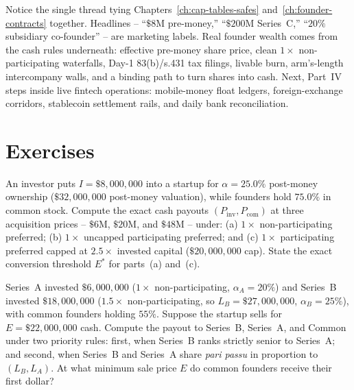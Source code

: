 \begin{walkbox}
Notice the single thread tying Chapters~\ref{ch:cap-tables-safes} and~\ref{ch:founder-contracts} together. Headlines -- ``$\$8\text{M}$ pre-money,'' ``$\$200\text{M}$ Series~C,'' ``$20\%$ subsidiary co-founder'' -- are marketing labels. Real founder wealth comes from the cash rules underneath: effective pre-money share price, clean $1\times$ non-participating waterfalls, Day-1 83(b)/s.431 tax filings, livable burn, arm's-length intercompany walls, and a binding path to turn shares into cash. Next, Part~IV steps inside live fintech operations: mobile-money float ledgers, foreign-exchange corridors, stablecoin settlement rails, and daily bank reconciliation.
\end{walkbox}

\section*{Exercises}

\begin{exercise}
An investor puts $I = \$8{,}000{,}000$ into a startup for $\alpha = 25.0\%$ post-money ownership ($\$32{,}000{,}000$ post-money valuation), while founders hold $75.0\%$ in common stock. Compute the exact cash payouts $(P_{\text{inv}}, P_{\text{com}})$ at three acquisition prices -- $\$6\text{M}$, $\$20\text{M}$, and $\$48\text{M}$ -- under: (a) $1\times$ non-participating preferred; (b) $1\times$ uncapped participating preferred; and (c) $1\times$ participating preferred capped at $2.5\times$ invested capital ($\$20{,}000{,}000$ cap). State the exact conversion threshold $E^*$ for parts~(a) and~(c).
\end{exercise}

\begin{exercise}
Series~A invested $\$6{,}000{,}000$ ($1\times$ non-participating, $\alpha_A = 20\%$) and Series~B invested $\$18{,}000{,}000$ ($1.5\times$ non-participating, so $L_B = \$27{,}000{,}000$, $\alpha_B = 25\%$), with common founders holding $55\%$. Suppose the startup sells for $E = \$22{,}000{,}000$ cash. Compute the payout to Series~B, Series~A, and Common under two priority rules: first, when Series~B ranks strictly senior to Series~A; and second, when Series~B and Series~A share \emph{pari passu} in proportion to $(L_B, L_A)$. At what minimum sale price $E$ do common founders receive their first dollar?
\end{exercise}

